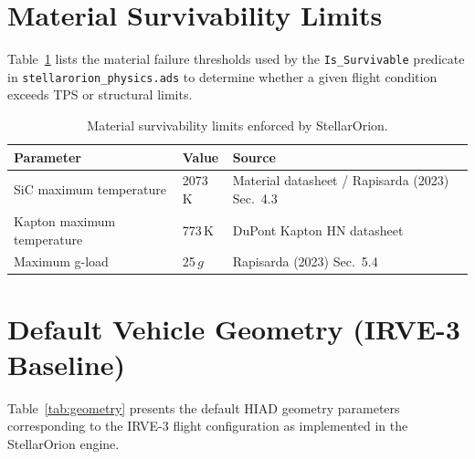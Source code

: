 \section{Material Survivability Limits}
\label{sec:survivability_limits}

Table~\ref{tab:survivability} lists the material failure thresholds used by the \texttt{Is\_Survivable} predicate in \texttt{stellarorion\_physics.ads} to determine whether a given flight condition exceeds TPS or structural limits.

\begin{table}[H]
\centering
\caption{Material survivability limits enforced by StellarOrion.}
\label{tab:survivability}
\begin{tabular}{lll}
\hline
\textbf{Parameter} & \textbf{Value} & \textbf{Source} \\
\hline
SiC maximum temperature & 2073\,K & Material datasheet / Rapisarda (2023) Sec.\ 4.3 \\
Kapton maximum temperature & 773\,K & DuPont Kapton HN datasheet \\
Maximum g-load & 25\,$g$ & Rapisarda (2023) Sec.\ 5.4 \\
\hline
\end{tabular}
\end{table}

\section{Default Vehicle Geometry (IRVE-3 Baseline)}
\label{sec:vehicle_geometry}

Table~\ref{tab:geometry} presents the default HIAD geometry parameters corresponding to the IRVE-3 flight configuration as implemented in the StellarOrion engine.

